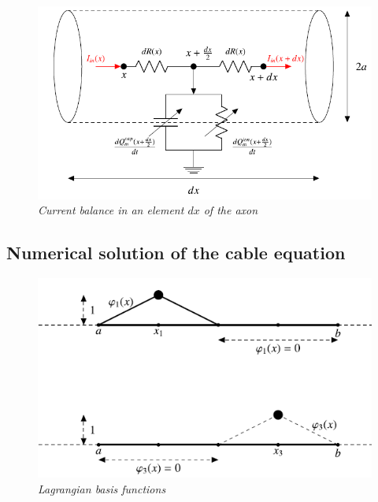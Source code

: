\documentclass[a4paper]{article}
\begin{document}
\begin{figure}[H]
	\begin{center}
		
		\includegraphics[scale=0.5]{curr_bal.png} 
	\end{center} 
	\caption{\textit{Current balance in an element $dx$ of the axon}}
	
\end{figure}

\subsection{Numerical solution of the cable equation}


\begin{figure}[H]
	\begin{center}
		
		\includegraphics[scale=0.7]{basis.png} 
	\end{center} 
	\caption{\textit{Lagrangian basis functions}}
	
\end{figure}
\end{document}
